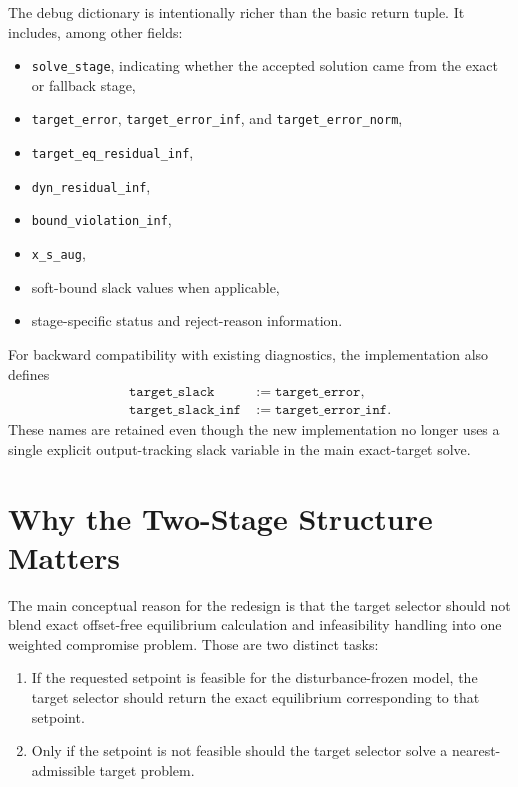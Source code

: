 \documentclass[11pt]{article}
\begin{document}
The debug dictionary is intentionally richer than the basic return tuple. It
includes, among other fields:
\begin{itemize}[leftmargin=2em]
    \item \texttt{solve\_stage}, indicating whether the accepted solution came
    from the exact or fallback stage,
    \item \texttt{target\_error}, \texttt{target\_error\_inf}, and
    \texttt{target\_error\_norm},
    \item \texttt{target\_eq\_residual\_inf},
    \item \texttt{dyn\_residual\_inf},
    \item \texttt{bound\_violation\_inf},
    \item \texttt{x\_s\_aug},
    \item soft-bound slack values when applicable,
    \item stage-specific status and reject-reason information.
\end{itemize}

For backward compatibility with existing diagnostics, the implementation also
defines
\begin{align}
    \texttt{target\_slack} &:= \texttt{target\_error}, \\
    \texttt{target\_slack\_inf} &:= \texttt{target\_error\_inf}.
\end{align}
These names are retained even though the new implementation no longer uses a
single explicit output-tracking slack variable in the main exact-target solve.

\section{Why the Two-Stage Structure Matters}
The main conceptual reason for the redesign is that the target selector should
not blend exact offset-free equilibrium calculation and infeasibility handling
into one weighted compromise problem. Those are two distinct tasks:
\begin{enumerate}[label=\arabic*.]
    \item If the requested setpoint is feasible for the disturbance-frozen model,
    the target selector should return the exact equilibrium corresponding to that
    setpoint.
    \item Only if the setpoint is not feasible should the target selector solve
    a nearest-admissible target problem.
\end{enumerate}
\end{document}
